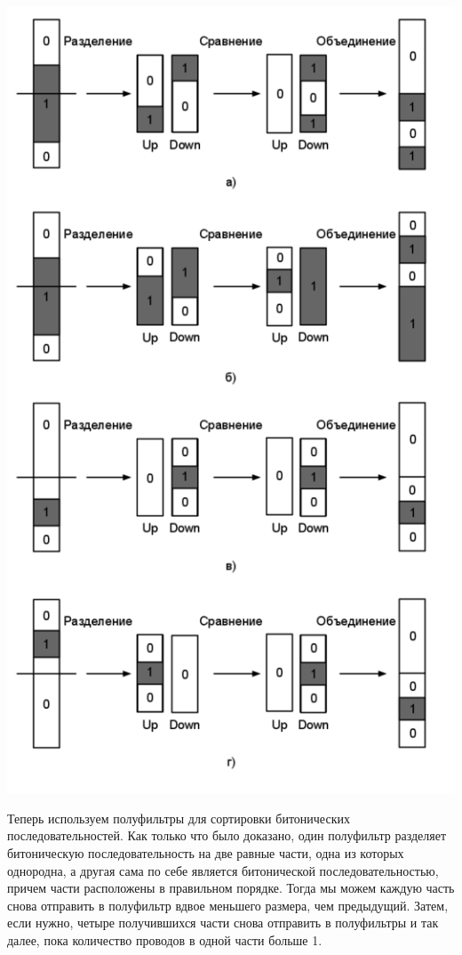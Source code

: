 \documentclass[a4paper,10pt]{article}
\begin{document}
\begin{center}\includegraphics[scale=0.5]{snet2.png}\end{center}
Теперь используем полуфильтры для сортировки битонических последовательностей. Как только что было доказано, один полуфильтр разделяет битоническую последовательность на две равные части, одна из которых однородна, а другая сама по себе является битонической последовательностью, причем части расположены в правильном порядке. Тогда мы можем каждую часть снова отправить в полуфильтр вдвое меньшего размера, чем предыдущий. Затем, если нужно, четыре получившихся части снова отправить в полуфильтры и так далее, пока количество проводов в одной части больше 1.\\
\end{document}
